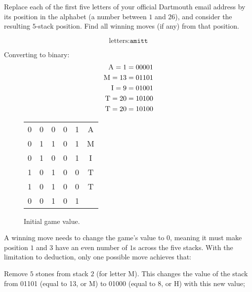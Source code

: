 \documentclass[11pt, reqno]{amsart}
\begin{document}
\newpage
\begin{problem}[11]
  Replace each of the first five letters of your official Dartmouth email address
  by its position in the alphabet (a number between $1$ and $26$),
  and consider the resulting $5$-stack \nim position.
  Find all winning moves (if any) from that position.

  \begin{multicols}{2}
    \[
      \text{letters:} \texttt{amitt}
    \]

    Converting to binary:
    \begin{align*}
      \textsc{A} = 1 &=  00001 \\
      \textsc{M} = 13 &= 01101 \\
      \textsc{I} = 9 &=  01001 \\
      \textsc{T} = 20 &= 10100 \\
      \textsc{T} = 20 &= 10100 \\
    \end{align*}
    
    \begin{figure}[H]
      \begin{tabular}{c@{\,}c@{\,}c@{\,}c@{\,}c@{\,}|c}
        0 & 0 & 0 & 0 & 1 & A\\
        0 & 1 & 1 & 0 & 1 & M\\
        0 & 1 & 0 & 0 & 1 & I\\
        1 & 0 & 1 & 0 & 0 & T\\
        1 & 0 & 1 & 0 & 0 & T\\
        \midrule
        0 & 0 & 1 & 0 & 1  
      \end{tabular}
      \caption{Initial game value.}
    \end{figure}
    A winning move needs to change the game's value to $0$,
    meaning it must make position $1$ and $3$ have an even number of
    $1$s across the five stacks.
    With the limitation to deduction, only one possible move achieves that:
    \begin{enumarabic}
      \item Remove $5$ stones from stack $2$ (for letter \textsc{M}).
        This changes the value of the stack from 01101 (equal to 13, or \textsc{M})
        to 01000 (equal to 8, or \textsc{H}) with this new value;


\end{enumarabic}
\end{multicols}
\end{problem}
\end{document}
